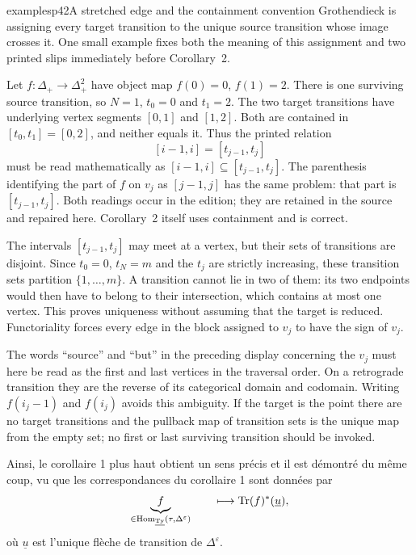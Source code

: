 \begin{dcomment}{examples}{p42}{A stretched edge and the containment convention}
Grothendieck is assigning every target transition to the unique source transition whose image crosses it. One small example fixes both the meaning of this assignment and two printed slips immediately before Corollary~2.

Let $f:\Delta_+\to\Delta_+^2$ have object map $f(0)=0$, $f(1)=2$. There is one surviving source transition, so $N=1$, $t_0=0$ and $t_1=2$. The two target transitions have underlying vertex segments $[0,1]$ and $[1,2]$. Both are contained in $[t_0,t_1]=[0,2]$, and neither equals it. Thus the printed relation
\[
 [i-1,i]=[t_{j-1},t_j]
\]
must be read mathematically as $[i-1,i]\subseteq[t_{j-1},t_j]$. The parenthesis identifying the part of $f$ on $v_j$ as $[j-1,j]$ has the same problem: that part is $[t_{j-1},t_j]$. Both readings occur in the edition; they are retained in the source and repaired here. Corollary~2 itself uses containment and is correct.

The intervals $[t_{j-1},t_j]$ may meet at a vertex, but their sets of transitions are disjoint. Since $t_0=0$, $t_N=m$ and the $t_j$ are strictly increasing, these transition sets partition $\{1,\ldots,m\}$. A transition cannot lie in two of them: its two endpoints would then have to belong to their intersection, which contains at most one vertex. This proves uniqueness without assuming that the target is reduced. Functoriality forces every edge in the block assigned to $v_j$ to have the sign of $v_j$.

The words ``source'' and ``but'' in the preceding display concerning the $v_j$ must here be read as the first and last vertices in the traversal order. On a retrograde transition they are the reverse of its categorical domain and codomain. Writing $f(i_j-1)$ and $f(i_j)$ avoids this ambiguity. If the target is the point there are no target transitions and the pullback map of transition sets is the unique map from the empty set; no first or last surviving transition should be invoked.
\end{dcomment}



Ainsi, le corollaire 1 plus haut obtient un sens précis et il est démontré du même coup, vu que les correspondances du corollaire 1 sont données par
\[
\underbrace{f}_{\in \mathrm{Hom}_{\underline{\mathrm{Ty}}}(\tau, \Delta^{\varepsilon})} \qquad \longmapsto \mathrm{Tr}(f)^*(\underline{u}),
\]
où $\underline{u}$ est l'unique flèche de transition de $\Delta^{\varepsilon}$.

